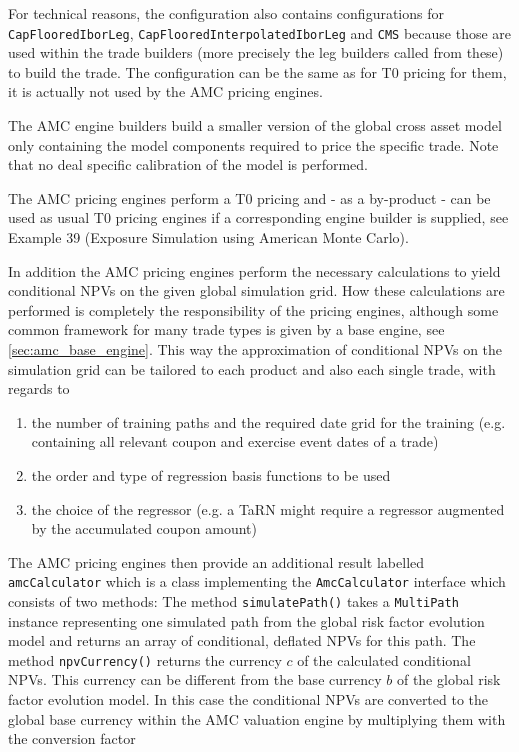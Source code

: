 For technical reasons, the configuration also contains configurations for \\ \verb+CapFlooredIborLeg+,
\verb+CapFlooredInterpolatedIborLeg+ and \verb+CMS+
because those are used within the trade builders (more precisely the leg builders called from these) to build the
trade. The configuration can be the same as for T0 pricing for them, it is actually not used by the AMC pricing engines.

The AMC engine builders build a smaller version of the global cross asset model only containing the model components
required to price the specific trade. Note that no deal specific calibration of the model is performed.

The AMC pricing engines perform a T0 pricing and - as a by-product - can be used as usual T0 pricing engines if a
corresponding engine builder is supplied, see Example 39 (Exposure Simulation using American Monte Carlo).

In addition the AMC pricing engines perform the necessary calculations to yield conditional NPVs on the given global
simulation grid. How these calculations are performed is completely the responsibility of the pricing engines, although
some common framework for many trade types is given by a base engine, see \ref{sec:amc_base_engine}. This way the
approximation of conditional NPVs on the simulation grid can be tailored to each product and also each single trade,
with regards to

\begin{enumerate}
\item the number of training paths and the required date grid for the training (e.g. containing all relevant coupon and
  exercise event dates of a trade)
\item the order and type of regression basis functions to be used
\item the choice of the regressor (e.g. a TaRN might require a regressor augmented by the accumulated coupon amount)
\end{enumerate}

The AMC pricing engines then provide an additional result labelled \verb+amcCalculator+ which is a class implementing
the \verb+AmcCalculator+ interface which consists of two methods: The method \verb+simulatePath()+ takes a
\verb+MultiPath+ instance representing one simulated path from the global risk factor evolution model and returns an
array of conditional, deflated NPVs for this path. The method \verb+npvCurrency()+ returns the currency $c$ of the
calculated conditional NPVs. This currency can be different from the base currency $b$ of the global risk factor
evolution model. In this case the conditional NPVs are converted to the global base currency within the AMC valuation
engine by multiplying them with the conversion factor

